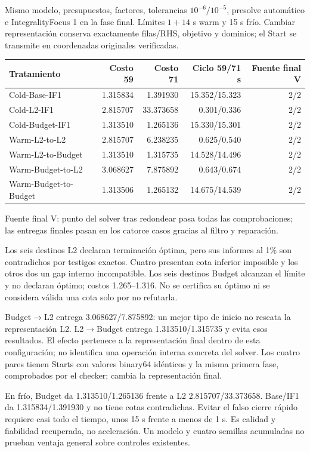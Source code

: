 \documentclass[10pt,a4paper]{article}
\begin{document}
Mismo modelo, presupuestos, factores, tolerancias $10^{-6}/10^{-5}$, presolve
automático e IntegralityFocus 1 en la fase final. Límites $1+14$ s warm y
15 s frío. Cambiar representación conserva exactamente filas/RHS, objetivo
y dominios; el Start se transmite en coordenadas originales verificadas.
\begin{center}\small\begin{tabular}{@{}lrrrr@{}}\toprule
Tratamiento & Costo 59 & Costo 71 & Ciclo 59/71 s & Fuente final V\\\midrule
Cold-Base-IF1 & 1.315834 & 1.391930 & 15.352/15.323 & 2/2\\
Cold-L2-IF1 & 2.815707 & 33.373658 & 0.301/0.336 & 2/2\\
Cold-Budget-IF1 & 1.313510 & 1.265136 & 15.330/15.301 & 2/2\\
Warm-L2-to-L2 & 2.815707 & 6.238235 & 0.625/0.540 & 2/2\\
Warm-L2-to-Budget & 1.313510 & 1.315735 & 14.528/14.496 & 2/2\\
Warm-Budget-to-L2 & 3.068627 & 7.875892 & 0.643/0.674 & 2/2\\
Warm-Budget-to-Budget & 1.313506 & 1.265132 & 14.675/14.539 & 2/2\\
\bottomrule\end{tabular}\end{center}
Fuente final V: punto del solver tras redondear pasa todas las comprobaciones;
las entregas finales pasan en los catorce casos gracias al filtro y reparación.

Los seis destinos L2 declaran terminación óptima, pero sus informes al 1\%
son contradichos por testigos exactos. Cuatro presentan cota inferior
imposible y los otros dos un gap interno incompatible. Los seis destinos
Budget alcanzan el límite y no declaran óptimo; costos 1.265--1.316.
No se certifica su óptimo ni se considera válida una cota solo por no refutarla.

Budget$\to$L2 entrega 3.068627/7.875892: un mejor tipo de inicio no rescata
la representación L2. L2$\to$Budget entrega 1.313510/1.315735 y evita esos
resultados. El efecto pertenece a la representación final dentro de esta
configuración; no identifica una operación interna concreta del solver.
Los cuatro pares tienen Starts con valores binary64 idénticos y la misma
primera fase, comprobados por el checker; cambia la representación final.

En frío, Budget da 1.313510/1.265136 frente a L2 2.815707/33.373658.
Base/IF1 da 1.315834/1.391930 y no tiene cotas contradichas. Evitar el falso
cierre rápido requiere casi todo el tiempo, unos 15 s frente a menos de 1 s.
Es calidad y fiabilidad recuperada, no aceleración. Un modelo y cuatro
semillas acumuladas no prueban ventaja general sobre controles existentes.
\newpage
\end{document}
